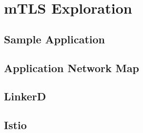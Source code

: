 %
%

\pagebreak
\section{mTLS Exploration}

\onehalfspacing

\subsection{Sample Application}

\subsection{Application Network Map}

\subsection{LinkerD}

\subsection{Istio}

